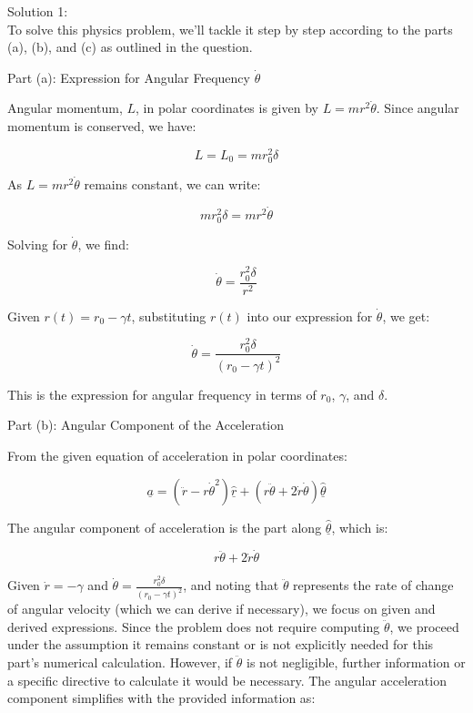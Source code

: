 \documentclass[a4paper,11pt]{article}
\begin{document}
\bigskip

\noindent Solution 1: \\

To solve this physics problem, we'll tackle it step by step according to the parts (a), (b), and (c) as outlined in the question.

Part (a): Expression for Angular Frequency \(\dot{\theta}\)

Angular momentum, \(L\), in polar coordinates is given by \(L = m r^2 \dot{\theta}\). Since angular momentum is conserved, we have:

\[
L = L_0 = m r_0^2 \delta
\]

As \(L = m r^2 \dot{\theta}\) remains constant, we can write:

\[
m r_0^2 \delta = m r^2 \dot{\theta}
\]

Solving for \(\dot{\theta}\), we find:

\[
\dot{\theta} = \frac{r_0^2 \delta}{r^2}
\]

Given \(r(t) = r_0 - \gamma t\), substituting \(r(t)\) into our expression for \(\dot{\theta}\), we get:

\[
\dot{\theta} = \frac{r_0^2 \delta}{(r_0 - \gamma t)^2}
\]

This is the expression for angular frequency in terms of \(r_0\), \(\gamma\), and \(\delta\).

Part (b): Angular Component of the Acceleration

From the given equation of acceleration in polar coordinates:

\[
\underline{a} = (\ddot{r} - r \dot{\theta}^{2}) \underline{\hat{r}} + (r \ddot{\theta} + 2\dot{r}\dot{\theta} ) \underline{\hat{\theta}}
\]

The angular component of acceleration is the part along \(\underline{\hat{\theta}}\), which is:

\[
r \ddot{\theta} + 2\dot{r}\dot{\theta}
\]

Given \(\dot{r} = -\gamma\) and \(\dot{\theta} = \frac{r_0^2 \delta}{(r_0 - \gamma t)^2}\), and noting that \(\ddot{\theta}\) represents the rate of change of angular velocity (which we can derive if necessary), we focus on given and derived expressions. Since the problem does not require computing \(\ddot{\theta}\), we proceed under the assumption it remains constant or is not explicitly needed for this part's numerical calculation. However, if \(\ddot{\theta}\) is not negligible, further information or a specific directive to calculate it would be necessary. The angular acceleration component simplifies with the provided information as:
\end{document}
